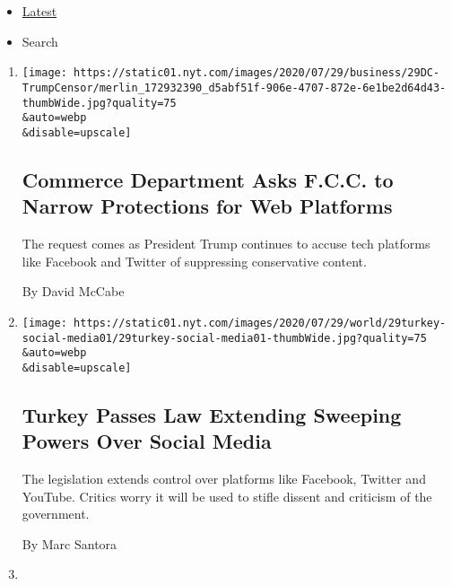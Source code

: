 \begin{itemize}
\tightlist
\item
  \protect\hyperlink{stream-panel}{Latest}
\item
  Search
\end{itemize}

\begin{enumerate}
\def\labelenumi{\arabic{enumi}.}
\item
  \href{/2020/07/29/technology/trump-fcc-twitter-facebook.html}{}

  \texttt{[image: https://static01.nyt.com/images/2020/07/29/business/29DC-TrumpCensor/merlin\_172932390\_d5abf51f-906e-4707-872e-6e1be2d64d43-thumbWide.jpg?quality=75\\\&auto=webp\\\&disable=upscale]}

  \hypertarget{commerce-department-asks-fcc-to-narrow-protections-for-web-platforms}{%
  \subsection{Commerce Department Asks F.C.C. to Narrow Protections for
  Web
  Platforms}\label{commerce-department-asks-fcc-to-narrow-protections-for-web-platforms}}

  The request comes as President Trump continues to accuse tech
  platforms like Facebook and Twitter of suppressing conservative
  content.

  By David McCabe
\item
  \href{/2020/07/29/world/europe/turkey-social-media-control.html}{}

  \texttt{[image: https://static01.nyt.com/images/2020/07/29/world/29turkey-social-media01/29turkey-social-media01-thumbWide.jpg?quality=75\\\&auto=webp\\\&disable=upscale]}

  \hypertarget{turkey-passes-law-extending-sweeping-powers-over-social-media}{%
  \subsection{Turkey Passes Law Extending Sweeping Powers Over Social
  Media}\label{turkey-passes-law-extending-sweeping-powers-over-social-media}}

  The legislation extends control over platforms like Facebook, Twitter
  and YouTube. Critics worry it will be used to stifle dissent and
  criticism of the government.

  By Marc Santora
\item
  \href{/2020/07/28/business/media/universal-amc-movies-at-home.html}{}


\end{enumerate}
